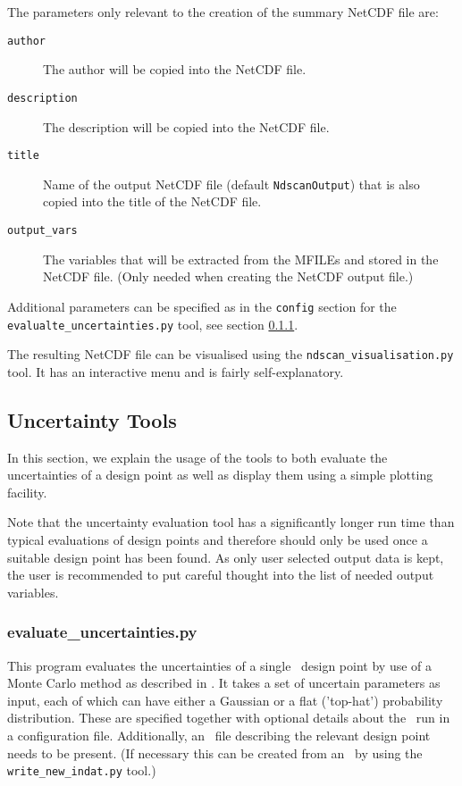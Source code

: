 The parameters only relevant to the creation of the summary NetCDF file are:
\begin{description}
\item[\texttt{author}] The author will be copied into the NetCDF file.
\item[\texttt{description}] The description will be copied into the NetCDF file.
\item[\texttt{title}] Name of the output NetCDF file (default \texttt{NdscanOutput}) that is also copied into the title of the NetCDF file.
\item[\texttt{output\_vars}] The variables that will be extracted from the MFILEs and stored in the NetCDF file. (Only needed when creating the NetCDF output file.)
\end{description}
Additional parameters can be specified as in the \texttt{config} section for the \texttt{evalualte\_uncertainties.py} tool, see section \ref{subsec:evalunc}.

The resulting NetCDF file can be visualised using the \texttt{ndscan\_visualisation.py} tool. It has an interactive menu and is fairly self-explanatory.


\subsection{Uncertainty Tools}

In this section, we explain the usage of the \process\/ tools to both evaluate
the uncertainties of a design point as well as display them using a simple
plotting facility.

Note that the uncertainty evaluation tool has a significantly longer run time
than typical evaluations of \process\/ design points and therefore should only
be used once a suitable design point has been found.  As only user selected
output data is kept, the user is recommended to put careful thought into the
list of needed output variables.

\subsubsection{evaluate\_uncertainties.py}
\label{subsec:evalunc}
This program evaluates the uncertainties of a single \process\ design point by
use of a Monte Carlo method as described in \cite{WPPMI2014Report}. It takes a
set of uncertain parameters as input, each of which can have either a Gaussian or a flat ('top-hat') probability distribution. These are specified together with optional details about the
\process\ run in a configuration file. Additionally, an \indat\ file
describing the relevant design point needs to be present. (If necessary this can be created
from an \mfile\ by using the \texttt{write\_new\_indat.py} tool.)


